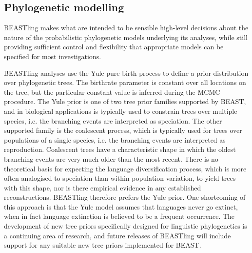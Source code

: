 \documentclass[twocolumn,10pt]{scrartcl}
\begin{document}
\subsection{Phylogenetic modelling}

BEASTling makes what are intended to be sensible high-level decisions about the nature of the probabilistic phylogenetic models underlying its analyses, while still providing sufficient control and flexibility that appropriate models can be specified for most investigations.

BEASTling analyses use the Yule pure birth process\cite{Yule1924} to define a prior distribution over phylogenetic trees.  The birthrate parameter is constant over all locations on the tree, but the particular constant value is inferred during the MCMC procedure.  The Yule prior is one of two tree prior families supported by BEAST, and in biological applications is typically used to constrain trees over multiple species, i.e. the branching events are interpreted as speciation.  The other supported family is the coalescent process\cite{Kingman1982}, which is typically used for trees over populations of a single species, i.e. the branching events are interpreted as reproduction.  Coalescent trees have a characteristic shape in which the oldest branching events are very much older than the most recent.  There is no theoretical basis for expecting the language diversification process, which is more often analogised to speciation than within-population variation, to yield trees with this shape, nor is there empirical evidence in any established reconstructions.  BEASTling therefore prefers the Yule prior.  One shortcoming of this approach is that the Yule model assumes that languages never go extinct, when in fact language extinction is believed to be a frequent occurrence.  The development of new tree priors specifically designed for linguistic phylogenetics is a continuing area of research, and future releases of BEASTling will include support for any suitable new tree priors implemented for BEAST.
\end{document}

